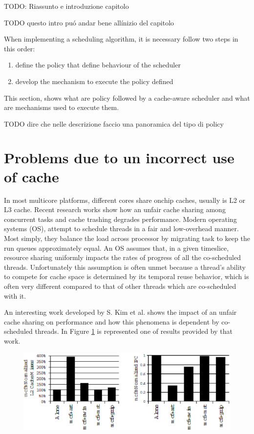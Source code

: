 
TODO: Riassunto e introduzione capitolo

TODO questo intro pu\'o andar bene all\'inizio del capitolo

When implementing a scheduling algorithm, it is necessary follow two steps in this order:

\begin{enumerate}
	\item{define the policy that define behaviour of the scheduler}
	\item{develop the mechanism to execute the policy defined}
\end{enumerate}

This section, shows what are policy followed by a cache-aware scheduler and what are mechanisms used to execute them.

TODO dire  che nelle descrizione faccio una panoramica del tipo di policy

\section{Problems due to un incorrect use of cache}
\label{sec:s1}

In most multicore platforms, different cores share onchip caches, usually is L2 or L3 cache. Recent research works show how an unfair cache sharing
among concurrent tasks and cache trashing degrades performance. Modern operating systems (OS), attempt to schedule threads in a
fair and low-overhead manner.
Most simply, they balance the load across processor by migrating task to keep the run queues approximately equal. An OS assumes that,
in a given timeslice, resource sharing uniformly impacts the rates of progress of all the co-scheduled threads.
Unfortunately this assumption is often unmet because a thread's ability to compete for cache space is determined by its temporal reuse behavior,
which is often very different compared to that of other threads which are co-scheduled with it.

An interesting work developed by S. Kim et al. shows the impact of an unfair cache sharing on performance and how this phenomena is dependent by
co-scheduled threads. In Figure \ref{fig:gzip_miss} is represented one of results provided by that work.

\begin{figure}[htbp]
\centering
\includegraphics[width=\widefigure]{images/chandra_gzip}
\caption{}
\label{fig:gzip_miss}
\end{figure}

